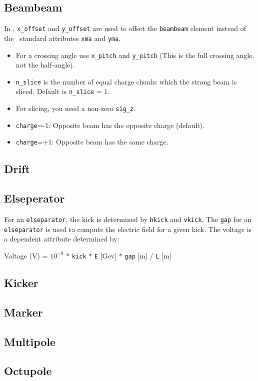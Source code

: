 \subsection{Beambeam}
In \bmad, {\tt x\_offset} and {\tt y\_offset} are used to offset the {\tt beambeam} element instead of
the \mad\ standard attributes {\tt xma} and {\tt yma}.
\begin{itemize}
\item For a crossing angle use {\tt x\_pitch} and {\tt y\_pitch} (This is the full crossing angle,
not the half-angle).
\item {\tt n\_slice} is the number of equal charge chunks which the strong beam is sliced.
      Default is {\tt n\_slice} = 1.
\item For slicing, you need a non-zero {\tt sig\_z}.
\item {\tt charge}=-1: Opposite beam has the opposite charge (default).
\item {\tt charge}=+1: Opposite beam has the same charge.   
\end{itemize}

\subsection{Drift}
\subsection{Elseperator}
For an {\tt elseparator}, the kick is determined by {\tt hkick} and {\tt vkick}. The {\tt gap} for an
{\tt elseparator} is used to compute the electric field for a given kick. The voltage is a dependent
attribute determined by:

Voltage (V) = $10^{-9}$ * {\tt kick} * {\tt E} [Gev] * {\tt gap} [m] / {\tt L} [m] 

\subsection{Kicker}
\subsection{Marker}
\subsection{Multipole}
\subsection{Octupole}
